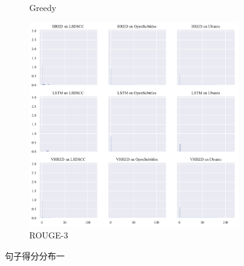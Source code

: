 \begin{figure}[H]
\begin{subfigure}{0.33\linewidth}
        \centering
        \caption{Greedy}
    \end{subfigure}%
    \begin{subfigure}{0.33\linewidth}
        \centering
        \includegraphics[width=\linewidth]{figure/distplot_grid/rouge_3/plot.pdf}
        \caption{ROUGE-3}
    \end{subfigure}
    \caption{句子得分分布一}
\end{figure}
